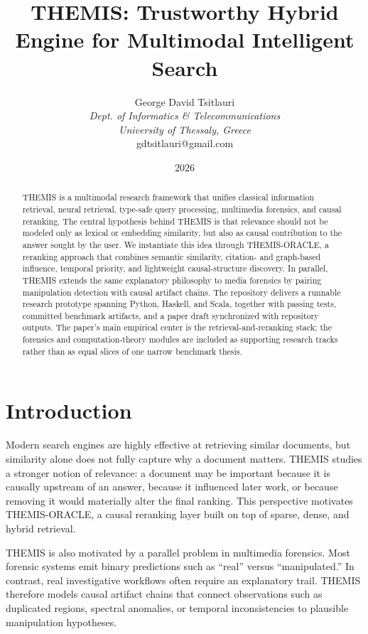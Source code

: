 \documentclass{article}
\title{THEMIS: Trustworthy Hybrid Engine for Multimodal Intelligent Search}
\author{George David Tsitlauri\\
\textit{Dept. of Informatics \& Telecommunications}\\
\textit{University of Thessaly, Greece}\\
gdtsitlauri@gmail.com}
\date{2026}
\begin{document}
\maketitle

\begin{abstract}
THEMIS is a multimodal research framework that unifies classical information retrieval, neural retrieval, type-safe query processing, multimedia forensics, and causal reranking. The central hypothesis behind THEMIS is that relevance should not be modeled only as lexical or embedding similarity, but also as causal contribution to the answer sought by the user. We instantiate this idea through THEMIS-ORACLE, a reranking approach that combines semantic similarity, citation- and graph-based influence, temporal priority, and lightweight causal-structure discovery. In parallel, THEMIS extends the same explanatory philosophy to media forensics by pairing manipulation detection with causal artifact chains. The repository delivers a runnable research prototype spanning Python, Haskell, and Scala, together with passing tests, committed benchmark artifacts, and a paper draft synchronized with repository outputs.
The paper's main empirical center is the retrieval-and-reranking stack; the
forensics and computation-theory modules are included as supporting research
tracks rather than as equal slices of one narrow benchmark thesis.
\end{abstract}

\section{Introduction}
Modern search engines are highly effective at retrieving similar documents, but similarity alone does not fully capture why a document matters. THEMIS studies a stronger notion of relevance: a document may be important because it is causally upstream of an answer, because it influenced later work, or because removing it would materially alter the final ranking. This perspective motivates THEMIS-ORACLE, a causal reranking layer built on top of sparse, dense, and hybrid retrieval.

THEMIS is also motivated by a parallel problem in multimedia forensics. Most forensic systems emit binary predictions such as ``real'' versus ``manipulated.'' In contrast, real investigative workflows often require an explanatory trail. THEMIS therefore models causal artifact chains that connect observations such as duplicated regions, spectral anomalies, or temporal inconsistencies to plausible manipulation hypotheses.
\end{document}
